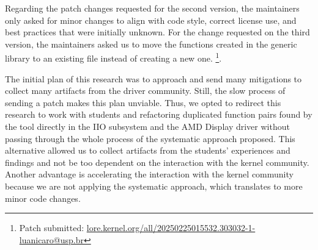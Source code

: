 Regarding the patch changes requested for the second version, the maintainers 
only asked for minor changes to align with code style, correct license use, 
and best practices that were initially unknown. For the change requested on 
the third version, the maintainers asked us to move the functions created in 
the generic library to an existing file instead of creating a new one.
\footnote{Patch submitted: \href{https://lore.kernel.org/all/20250225015532.303032-1-luanicaro@usp.br/}{lore.kernel.org/all/20250225015532.303032-1-luanicaro@usp.br}}.

The initial plan of this research was to approach and send many mitigations to collect 
many artifacts from the driver community. Still, the slow process of sending a patch 
makes this plan unviable. Thus, we opted to redirect this research to work with students 
and refactoring duplicated function pairs found by the tool directly in the IIO subsystem and the 
AMD Display driver without passing through the whole process of the systematic approach 
proposed. This alternative allowed us to collect artifacts from the students' experiences 
and findings and not be too dependent on the interaction with the kernel community. 
Another advantage is accelerating the interaction with the kernel community because we are 
not applying the systematic approach, which translates to more minor code changes.
